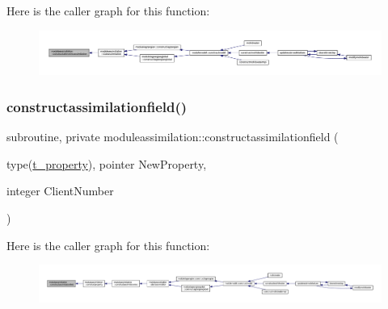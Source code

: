 Here is the caller graph for this function\+:\nopagebreak
\begin{figure}[H]
\begin{center}
\leavevmode
\includegraphics[width=350pt]{namespacemoduleassimilation_a26af0cc2dc6eb3e9e9dbefe2fb8c7b48_icgraph}
\end{center}
\end{figure}
\mbox{\label{namespacemoduleassimilation_a458bfa1ab529ff7ecd2b6105aa5c04c3}} 
\subsubsection{\texorpdfstring{constructassimilationfield()}{constructassimilationfield()}}
{\footnotesize\ttfamily subroutine, private moduleassimilation\+::constructassimilationfield (\begin{DoxyParamCaption}\item[{type(\mbox{\hyperlink{structmoduleassimilation_1_1t__property}{t\+\_\+property}}), pointer}]{New\+Property,  }\item[{integer}]{Client\+Number }\end{DoxyParamCaption})\hspace{0.3cm}{\ttfamily [private]}}

Here is the caller graph for this function\+:\nopagebreak
\begin{figure}[H]
\begin{center}
\leavevmode
\includegraphics[width=350pt]{namespacemoduleassimilation_a458bfa1ab529ff7ecd2b6105aa5c04c3_icgraph}
\end{center}
\end{figure}
\mbox{\label{namespacemoduleassimilation_a6f4678dd5995e947ccdc126f9abf9f6c}} 
